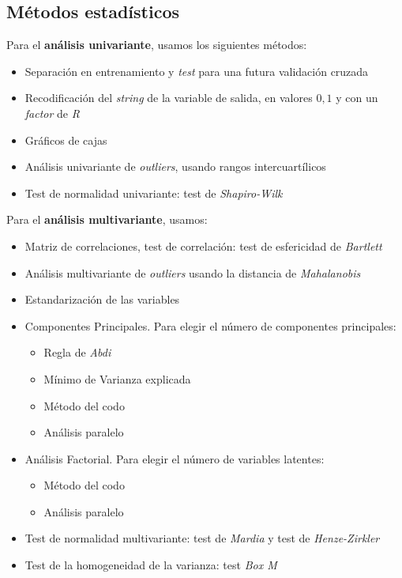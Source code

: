 \documentclass[11pt]{article}
\begin{document}
\subsection{Métodos estadísticos}

Para el \textbf{análisis univariante}, usamos los siguientes métodos:

\begin{itemize}
    \item Separación en entrenamiento y \textit{test} para una futura validación cruzada
    \item Recodificación del \textit{string} de la variable de salida, en valores $0, 1$ y con un \textit{factor} de \textit{R}
    \item Gráficos de cajas
    \item Análisis univariante de \textit{outliers}, usando rangos intercuartílicos
    \item Test de normalidad univariante: test de \textit{Shapiro-Wilk}
\end{itemize}

Para el \textbf{análisis multivariante}, usamos:


\begin{itemize}
    \item Matriz de correlaciones, test de correlación: test de esfericidad de \textit{Bartlett}
    \item Análisis multivariante de \textit{outliers} usando la distancia de \textit{Mahalanobis}
    \item Estandarización de las variables
    \item Componentes Principales. Para elegir el número de componentes principales:
        \begin{itemize}
            \item Regla de \textit{Abdi}
            \item Mínimo de Varianza explicada
            \item Método del codo
            \item Análisis paralelo
        \end{itemize}
    \item Análisis Factorial. Para elegir el número de variables latentes:
        \begin{itemize}
            \item Método del codo
            \item Análisis paralelo
        \end{itemize}
    \item Test de normalidad multivariante: test de \textit{Mardia} y test de \textit{Henze-Zirkler}
    \item Test de la homogeneidad de la varianza: test \textit{Box M}
\end{itemize}
\end{document}
